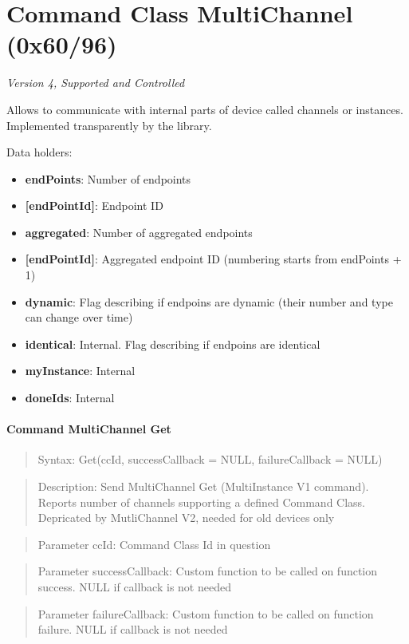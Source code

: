 \section{Command Class MultiChannel (0x60/96)}

\textit{Version 4, Supported and Controlled}
\newline

Allows to communicate with internal parts of device called channels or instances. Implemented transparently by the library.
\newline

\noindent
Data holders:

\begin{itemize}
\item \textbf{endPoints}: Number of endpoints
\item \qquad\textbf{[endPointId]}: Endpoint ID
\item \textbf{aggregated}: Number of aggregated endpoints
\item \qquad\textbf{[endPointId]}: Aggregated endpoint ID (numbering starts from endPoints + 1)
\item \textbf{dynamic}: Flag describing if endpoins are dynamic (their number and type can change over time)
\item \textbf{identical}: Internal. Flag describing if endpoins are  identical
\item \textbf{myInstance}: Internal
\item \textbf{doneIds}: Internal
\end{itemize}

\paragraph{Command MultiChannel Get}
\begin{quote}Syntax: Get(ccId, successCallback = NULL, failureCallback = NULL)\end{quote}
\begin{quote}Description: Send MultiChannel Get (MultiInstance V1 command). Reports number of channels supporting a defined Command Class. Depricated by MutliChannel V2, needed for old devices only\end{quote}
\begin{quote}Parameter ccId: Command Class Id in question\end{quote}
\begin{quote}Parameter successCallback: Custom function to be called on function success. NULL if callback is not needed\end{quote}
\begin{quote}Parameter failureCallback: Custom function to be called on function failure. NULL if callback is not needed\end{quote}


